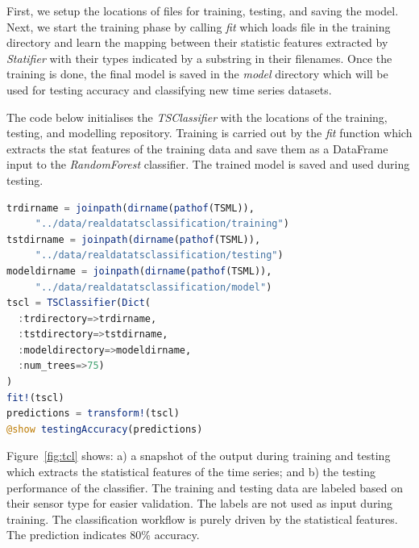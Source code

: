 \documentclass{juliacon}
\begin{document}
\vskip 6pt

First, we setup the locations of files for training, testing, and saving the model.
Next, we start the training phase by calling \emph{fit} which loads
file in the training directory and learn the mapping between their
statistic features extracted by \emph{Statifier} with their types indicated
by a substring in their filenames. Once the training is done, the final model
is saved in the \emph{model} directory which will be used for 
testing accuracy and classifying new time series datasets. 

\vskip 6pt

The code below initialises the \emph{TSClassifier} with the locations of the training, testing, and modelling repository. Training is carried out by the \emph{fit} function which extracts the stat features of the training data and save them as a DataFrame input to the \emph{RandomForest} classifier. The trained model is saved and used during testing.

\begin{lstlisting}[language = Julia]
trdirname = joinpath(dirname(pathof(TSML)),
     "../data/realdatatsclassification/training")
tstdirname = joinpath(dirname(pathof(TSML)),
     "../data/realdatatsclassification/testing")
modeldirname = joinpath(dirname(pathof(TSML)),
     "../data/realdatatsclassification/model")
tscl = TSClassifier(Dict(
  :trdirectory=>trdirname,
  :tstdirectory=>tstdirname,
  :modeldirectory=>modeldirname,
  :num_trees=>75)
)
fit!(tscl)
predictions = transform!(tscl)
@show testingAccuracy(predictions)
\end{lstlisting}

Figure~\ref{fig:tcl} shows: a) a snapshot of the output during training and testing which extracts the statistical features of the time series; and b) the testing performance of the classifier. The training and testing data are labeled based on their sensor type for easier validation. The labels are not used as input during training. The classification workflow is purely driven by the statistical features. The prediction indicates 80\% accuracy.
\end{document}
